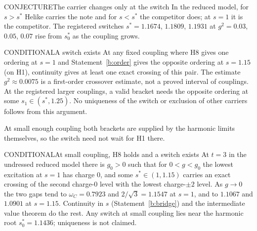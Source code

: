 \begin{claim}{CONJECTURE}{The carrier changes only at the switch}\label{b:switch}
In the reduced model, for $s>s^*$ Helike carries the note and for $s<s^*$ the competitor does; at $s=1$ it is the
competitor. The registered switches $s^*=1.1674$, $1.1809$, $1.1931$ at $g^2=0.03$, $0.05$, $0.07$ rise from $s_0^*$ as
the coupling grows.
\end{claim}

\begin{claim}{CONDITIONAL}{A switch exists}\label{b:ivt}
At any fixed coupling where H8 gives one ordering at $s=1$ and Statement~\ref{b:order} gives the opposite ordering at
$s=1.15$ (on H1), continuity gives at least one exact crossing of this pair. The estimate
$g^2\approx0.0075$ is a first-order crossover estimate, not a proved interval of couplings.
At the registered larger couplings, a valid bracket needs the opposite ordering at some $s_1\in(s^*,1.25)$.
No uniqueness of the switch or exclusion of other carriers follows from this argument.
\end{claim}

At small enough coupling both brackets are supplied by the harmonic limits themselves, so the switch need not wait for
H1 there.

\begin{claim}{CONDITIONAL}{At small coupling, H8 holds and a switch exists}\label{b:smallg}
At $t=3$ in the undressed reduced model there is $g_0>0$ such that for $0<g<g_0$ the lowest excitation at $s=1$
has charge 0, and some $s^*\in(1,1.15)$ carries an exact crossing of the second charge-0 level with the lowest
charge-$\pm2$ level. As $g\to0$ the two gaps tend to $\omega_C=0.7923$ and $2/\sqrt3=1.1547$ at $s=1$, and to
$1.1067$ and $1.0901$ at $s=1.15$. Continuity in $s$ (Statement~\ref{b:bridge}) and the intermediate value theorem do
the rest. Any switch at small coupling lies near the harmonic root $s_0^*=1.1436$; uniqueness is not claimed.
\end{claim}

